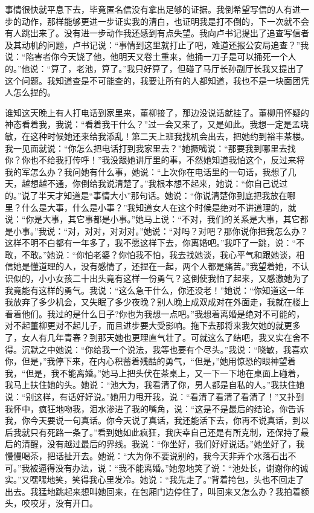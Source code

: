 \documentclass[12pt,oneside]{book}
\begin{document}
事情很快就平息下去，毕竟匿名信没有拿出足够的证据。我倒希望写信的人有进一步的动作，那样能够更进一步证实我的清白，也证明我是打不倒的，下一次就不会有人跳出来了。没有进一步动作我还感到有点失望。我向卢书记提出了追查写信者及其动机的问题，卢书记说：``事情到这里就打止了吧，难道还报公安局追查？''我说：``陷害者你今天饶了他，他明天又卷土重来，他捅一刀子是可以捅死一个人的。''他说：``算了，老池，算了。''我只好算了，但碰了马厅长孙副厅长我又提出了这个问题。我知道查是不可能查的，我要让所有的人都知道，我也不是一块面团凭人怎么捏的。

谁知这天晚上有人打电话到家里来，董柳接了，那边没说话就挂了。董柳用怀疑的神态看着我，我说：``看着我干什么？''过一会又来了，又是如此。我想一定是孟晓敏，在这种时候她还来给我添乱！第二天上班我找机会出去，把她约到裕丰茶楼。我一见面就说：``你怎么把电话打到我家里去？''她撅嘴说：``那要我到哪里去找你？你也不给我打传呼！''我没跟她讲厅里的事，不然她知道我怕这个，反过来将我的军怎么办？我问她有什么事，她说：``上次你在电话里的一句话，我想了几天，越想越不通，你倒给我说清楚了。''我根本想不起来，她说：``你自己说过的。''说了半天才知道是``事情大小''那句话。她说：``你说清楚你到底把我放在哪里？什么是大事，什么是小事？''我知道女人在这个时候是绝对不讲道理的，就说：``你是大事，其它事都是小事。''她马上说：``不对，我们的关系是大事，其它都是小事。''我说：``对，对对，对对对。''她说：``对吗？对吧？那你说你把我怎么办？这样不明不白都有一年多了，我不愿这样下去，你离婚吧。''我吓了一跳，说：``不敢，不敢。''她说：``你怕老婆？你怕我不怕，我去找她谈，我心平气和跟她谈，相信她是懂道理的人，没有感情了，还捏在一起，两个人都是痛苦。''我望着她，不认识似的，小小女孩二十出头竟有这样一份勇气？这倒使我怕了起来，又感激她为了我竟能有这样的勇气。我说：``这么急干什么，你还没老！''她说：``你知道这一年我放弃了多少机会，又失眠了多少夜晚？别人晚上成双成对在外面走，我就在楼上看着他们。我过的是什么日子?你也为我想一点吧。''我想着离婚是绝对不可能的，对不起董柳更对不起儿子，而且进步要大受影响。拖下去那将来我欠她的就更多了，女人有几年青春？到那天她也更理直气壮了。可就这么了结吧，我又实在舍不得。沉默之中她说：``你给我一个说法，我等也要有个尽头。''我说：``晓敏，我喜欢你，但是，''我停下来，在内心积蓄着残酷的勇气，``但是，''她用惊恐的眼神望着我，``但是，我不能离婚。''她马上把头伏在茶桌上，又一下一下地在桌面上碰着，我马上扶住她的头。她说：``池大为，我看清了你，男人都是自私的人。''我扶住她说：``别这样，有话好好说。''她用力甩开我，说：``看清了看清了看清了！''又扑到我怀中，疯狂地吻我，泪水渗进了我的嘴角，说：``这是不是最后的结论，你告诉我，你今天要说一句真话。你今天说了真话，我还能活下去，你再不说真话，到以后我就只有死路一条了。''看到她如此疯狂，我庆幸自己还是有所克制，还保持了最后的清醒，没有越过最后的界线。我说：``你坐好，我们好好说话。''她坐好了，我慢慢喝茶，把话扯开去。她说：``大为你不要说别的，我今天非弄个水落石出不可。''我被逼得没有办法，说：``我不能离婚。''她忽地笑了说：``池处长，谢谢你的诚实。''又嘿嘿地笑，笑得我心里发冷。她说：``我先走了。''背着挎包，头也不回走了出去。我猛地跳起来想叫她回来，在包厢门边停住了，叫回来又怎么办？我拍着额头，咬咬牙，没有开口。
\end{document}
